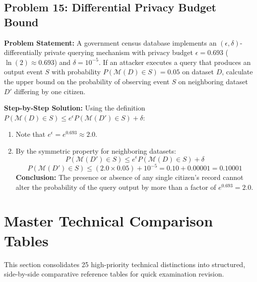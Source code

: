 \subsection*{Problem 15: Differential Privacy Budget Bound}
\textbf{Problem Statement:} A government census database implements an $(\epsilon, \delta)$-differentially private querying mechanism with privacy budget $\epsilon = 0.693$ ($\ln(2) \approx 0.693$) and $\delta = 10^{-5}$.
If an attacker executes a query that produces an output event $S$ with probability $P(\mathcal{M}(D) \in S) = 0.05$ on dataset $D$, calculate the upper bound on the probability of observing event $S$ on neighboring dataset $D'$ differing by one citizen.

\textbf{Step-by-Step Solution:}
Using the definition $P(\mathcal{M}(D) \in S) \le e^{\epsilon} P(\mathcal{M}(D') \in S) + \delta$:
\begin{enumerate}[label=\arabic*.]
    \item Note that $e^{\epsilon} = e^{0.693} \approx 2.0$.
    \item By the symmetric property for neighboring datasets:
    \[
    P(\mathcal{M}(D') \in S) \le e^{\epsilon} P(\mathcal{M}(D) \in S) + \delta
    \]
    \[
    P(\mathcal{M}(D') \in S) \le (2.0 \times 0.05) + 10^{-5} = 0.10 + 0.00001 = \mathbf{0.10001}
    \]
    \textbf{Conclusion:} The presence or absence of any single citizen's record cannot alter the probability of the query output by more than a factor of $e^{0.693} = 2.0$.
\end{enumerate}


\section{Master Technical Comparison Tables}
\label{sec:cloud_ml_comparison_tables}

This section consolidates 25 high-priority technical distinctions into structured, side-by-side comparative reference tables for quick examination revision.

